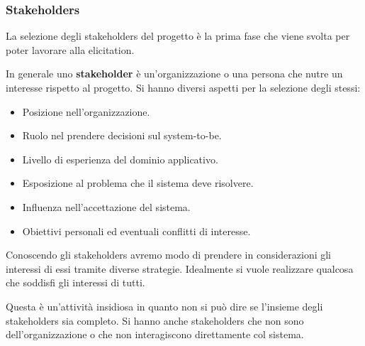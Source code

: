\subsubsection{Stakeholders}
La selezione degli stakeholders del progetto è la prima fase che viene svolta
per poter lavorare alla elicitation.
\begin{definizione}
      In generale uno \textbf{stakeholder} è un'organizzazione o una persona che
      nutre un interesse rispetto al progetto. Si hanno diversi aspetti per la
      selezione degli stessi:
      \begin{itemize}
            \item Posizione nell'organizzazione.
            \item Ruolo nel prendere decisioni sul system-to-be.
            \item Livello di esperienza del dominio applicativo.
            \item Esposizione al problema che il sistema deve risolvere.
            \item Influenza nell'accettazione del sistema.
            \item Obiettivi personali ed eventuali conflitti di interesse.
      \end{itemize}
\end{definizione}
Conoscendo gli stakeholders avremo modo di prendere in considerazioni gli
interessi di essi tramite diverse strategie. Idealmente si vuole realizzare
qualcosa che soddisfi gli interessi di tutti.

Questa è un'attività insidiosa in quanto non si può dire se l'insieme degli
stakeholders sia completo. Si hanno anche stakeholders che non sono
dell'organizzazione o che non interagiscono direttamente col sistema.

